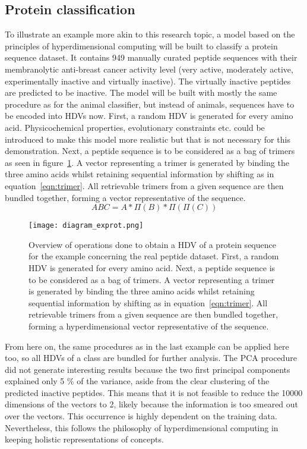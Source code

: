 \subsection*{Protein classification}
\label{ssec:protclas}
To illustrate an example more akin to this research topic, a model based on the principles of hyperdimensional computing will be built to classify a protein sequence dataset\cite{anticancer}. It contains 949 manually curated peptide sequences with their membranolytic anti-breast cancer activity level (very active, moderately active, experimentally inactive and virtually inactive). The virtually inactive peptides are predicted to be inactive. The model will be built with mostly the same procedure as for the animal classifier, but instead of animals, sequences have to be encoded into HDVs now. First, a random HDV is generated for every amino acid. Physicochemical properties, evolutionary constraints etc. could be introduced to make this model more realistic but that is not necessary for this demonstration. Next, a peptide sequence is to be considered as a bag of trimers as seen in figure~\ref{fig:diagram_exprot}. A vector representing a trimer is generated by binding the three amino acids whilst retaining sequential information by shifting as in equation~\ref{eqn:trimer}. All retrievable trimers from a given sequence are then bundled together, forming a vector representative of the sequence. 
\begin{equation}\label{eqn:trimer}
    ABC = A * \Pi (B) * \Pi (\Pi (C))
\end{equation}
\begin{figure}[h]
    \centering
    \texttt{[image: diagram\_exprot.png]}
    \caption{Overview of operations done to obtain a HDV of a protein sequence for the example concerning the real peptide dataset. First, a random HDV is generated for every amino acid. Next, a peptide sequence is to be considered as a bag of trimers. A vector representing a trimer is generated by binding the three amino acids whilst retaining sequential information by shifting as in equation~\ref{eqn:trimer}. All retrievable trimers from a given sequence are then bundled together, forming a hyperdimensional vector representative of the sequence.}
    \label{fig:diagram_exprot}
\end{figure}
From here on, the same procedures as in the last example can be applied here too, so all HDVs of a class are bundled for further analysis. The PCA procedure did not generate interesting results because the two first principal components explained only 5 \% of the variance, aside from the clear clustering of the predicted inactive peptides. This means that it is not feasible to reduce the 10000 dimensions of the vectors to 2, likely because the information is too smeared out over the vectors. This occurrence is highly dependent on the training data. Nevertheless, this follows the philosophy of hyperdimensional computing in keeping holistic representations of concepts.

